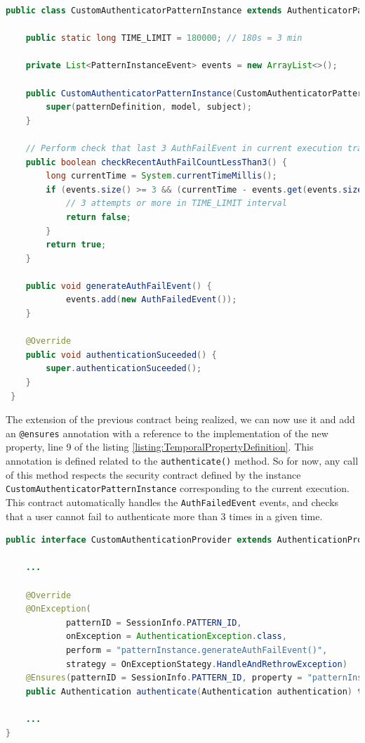 \begin{lstlisting}[language=Java,basicstyle=\ttfamily\footnotesize, caption=\texttt{AuthenticatorPatternInstance} specialization to add the P7 property implementation,label=listing:CustomAuthenticatorPatternInstance]
public class CustomAuthenticatorPatternInstance extends AuthenticatorPatternInstance<CustomAuthenticationProvider, SessionInfo, String, UsernamePasswordAuthenticationToken> {

	public static long TIME_LIMIT = 180000; // 180s = 3 min

	private List<PatternInstanceEvent> events = new ArrayList<>();

	public CustomAuthenticatorPatternInstance(CustomAuthenticatorPatternDefinition patternDefinition, PamelaModel model, SessionInfo subject) {
		super(patternDefinition, model, subject);
	}

	// Perform check that last 3 AuthFailEvent in current execution trace were not raised within allowed time limit
	public boolean checkRecentAuthFailCountLessThan3() {
		long currentTime = System.currentTimeMillis();
		if (events.size() >= 3 && (currentTime - events.get(events.size() - 3).getDate()) < TIME_LIMIT) {
			// 3 attempts or more in TIME_LIMIT interval
			return false;
		}
		return true;
	}

	public void generateAuthFailEvent() {
			events.add(new AuthFailedEvent());
    }

	@Override
	public void authenticationSuceeded() {
		super.authenticationSuceeded();
	}
 }
\end{lstlisting}


The extension of the previous contract being realized, we can now use it and add an \texttt{@ensures} annotation with a reference to the implementation of the new property, line 9 of the listing \ref{listing:TemporalPropertyDefinition}.
This annotation is defined related to the \texttt{authenticate()} method.
So for now, any call of this method respects the security contract defined by the instance \texttt{CustomAuthenticatorPatternInstance} corresponding to the current execution. This contract automatically handles the \texttt{AuthFailedEvent} events, and checks that a user cannot fail to authenticate more than 3 times in a given time. 




\begin{lstlisting}[language=Java,basicstyle=\ttfamily\footnotesize, caption=Contract definition with applying with the P7 property,label=listing:TemporalPropertyDefinition]
public interface CustomAuthenticationProvider extends AuthenticationProvider {

    ...
    
	@Override
	@OnException(
			patternID = SessionInfo.PATTERN_ID,
			onException = AuthenticationException.class,
			perform = "patternInstance.generateAuthFailEvent()",
			strategy = OnExceptionStategy.HandleAndRethrowException)
	@Ensures(patternID = SessionInfo.PATTERN_ID, property = "patternInstance.checkRecentAuthFailCountLessThan3()")
    public Authentication authenticate(Authentication authentication) throws AuthenticationException;

    ...
}
\end{lstlisting}



